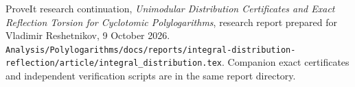 ProveIt research continuation,
\emph{Unimodular Distribution Certificates and Exact Reflection Torsion
for Cyclotomic Polylogarithms}, research report prepared for
Vladimir Reshetnikov, 9 October 2026.
\nolinkurl{Analysis/Polylogarithms/docs/reports/integral-distribution-reflection/article/integral_distribution.tex}.
Companion exact certificates and independent verification scripts are
in the same report directory.

